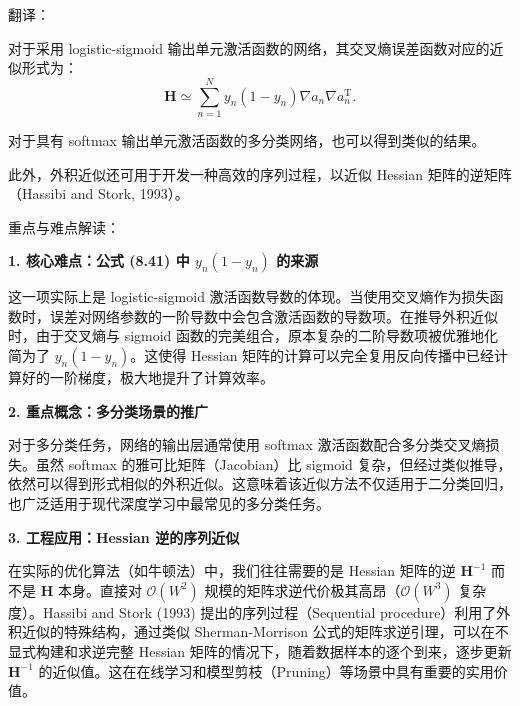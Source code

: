 \documentclass{article}
\begin{document}

{\color{red}
翻译：

对于采用 logistic-sigmoid 输出单元激活函数的网络，其交叉熵误差函数对应的近似形式为：
\begin{equation}
    \mathbf{H} \simeq \sum_{n=1}^N y_n (1 - y_n) \nabla a_n \nabla a_n^\mathrm{T}.
    \tag{8.41}
\end{equation}

对于具有 softmax 输出单元激活函数的多分类网络，也可以得到类似的结果。

此外，外积近似还可用于开发一种高效的序列过程，以近似 Hessian 矩阵的逆矩阵（Hassibi and Stork, 1993）。

}

{\color{blue}
重点与难点解读：

\textbf{1. 核心难点：公式 (8.41) 中 $y_n(1-y_n)$ 的来源}

这一项实际上是 logistic-sigmoid 激活函数导数的体现。当使用交叉熵作为损失函数时，误差对网络参数的一阶导数中会包含激活函数的导数项。在推导外积近似时，由于交叉熵与 sigmoid 函数的完美组合，原本复杂的二阶导数项被优雅地化简为了 $y_n(1-y_n)$。这使得 Hessian 矩阵的计算可以完全复用反向传播中已经计算好的一阶梯度，极大地提升了计算效率。

\textbf{2. 重点概念：多分类场景的推广}

对于多分类任务，网络的输出层通常使用 softmax 激活函数配合多分类交叉熵损失。虽然 softmax 的雅可比矩阵（Jacobian）比 sigmoid 复杂，但经过类似推导，依然可以得到形式相似的外积近似。这意味着该近似方法不仅适用于二分类回归，也广泛适用于现代深度学习中最常见的多分类任务。

\textbf{3. 工程应用：Hessian 逆的序列近似}

在实际的优化算法（如牛顿法）中，我们往往需要的是 Hessian 矩阵的逆 $\mathbf{H}^{-1}$ 而不是 $\mathbf{H}$ 本身。直接对 $\mathcal{O}(W^2)$ 规模的矩阵求逆代价极其高昂（$\mathcal{O}(W^3)$ 复杂度）。Hassibi and Stork (1993) 提出的序列过程（Sequential procedure）利用了外积近似的特殊结构，通过类似 Sherman-Morrison 公式的矩阵求逆引理，可以在不显式构建和求逆完整 Hessian 矩阵的情况下，随着数据样本的逐个到来，逐步更新 $\mathbf{H}^{-1}$ 的近似值。这在在线学习和模型剪枝（Pruning）等场景中具有重要的实用价值。

}
\end{document}
